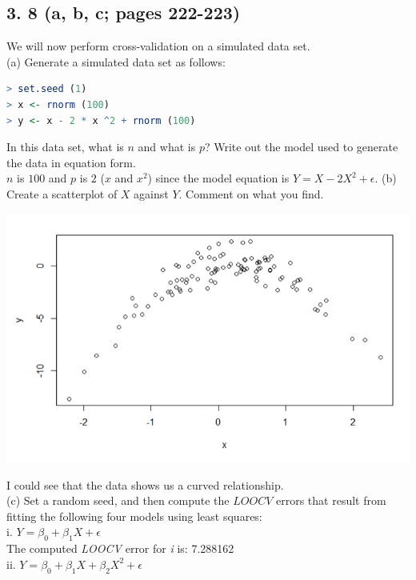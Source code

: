\documentclass{article}
\begin{document}
\subsection*{3. 8 (a, b, c; pages 222-223)}
We will now perform cross-validation on a simulated data set. \\
(a) Generate a simulated data set as follows: 
\begin{lstlisting}[language=R]
> set.seed (1)
> x <- rnorm (100)
> y <- x - 2 * x ^2 + rnorm (100)
\end{lstlisting}
In this data set, what is $n$ and what is $p$? Write out the model used to generate the data in equation form. \\
\indent $n$ is $100$ and $p$ is $2$ ($x$ and $x^2$) since the model equation is $Y = X - 2X^2 + \epsilon$.
\linebreak (b) Create a scatterplot of $X$ against $Y$. Comment on what you find. \\
\begin{center}
\includegraphics[scale = 0.46]{3.8.b.png} \\
\end{center}
I could see that the data shows us a curved relationship. \\
\linebreak (c) Set a random seed, and then compute the $LOOCV$ errors that result from fitting the following four models using least squares: \\
i. $Y = \beta_0 + \beta_1X + \epsilon$ \\
\indent The computed \textit{LOOCV} error for \textit{i} is: 7.288162 \\
\linebreak ii. $Y = \beta_0 + \beta_1X + \beta_2X^2 + \epsilon$ \\
\end{document}
